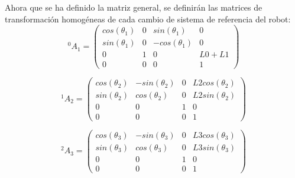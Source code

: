 	Ahora que se ha definido la matriz general, se definirán las matrices de transformación homogéneas de cada cambio de sistema de referencia del robot: \\
	
	\[ {^0}A_{1} =
	\left( \begin{array}{cccc}
	cos(\theta_{1}) &  0 &  sin(\theta_{1}) & 0  \\ 
	sin(\theta_{1}) &  0 & -cos(\theta_{1}) & 0  \\
	0		&  1 &		 0 			& L0+L1 \\
	0		&  0 & 		 0			& 1
	\end{array} \right) \]
	
	\[ {^1}A_{2} =
	\left( \begin{array}{cccc}
	cos(\theta_{2}) & -sin(\theta_{2}) & 0 & L2cos(\theta_{2}) \\ 
	sin(\theta_{2}) & cos(\theta_{2})  & 0 & L2sin(\theta_{2})  \\
	0 		 	   & 			0 			& 1	& 		0 			 \\
	0		 	   &			 0			& 0	& 		1
	\end{array} \right) \]
	
	\[ {^2}A_{3} =
	\left( \begin{array}{cccc}
	cos(\theta_{3}) &  -sin(\theta_{3}) &  0 & L3cos(\theta_{3})   \\ 
	sin(\theta_{3}) &  cos(\theta_{3}) &  0 & L3sin(\theta_{3})   \\
	0 					 &  0 &  				1 					  & 0 \\
	0 					 &  0 & 				 0					  & 1
	\end{array} \right) \]
	
